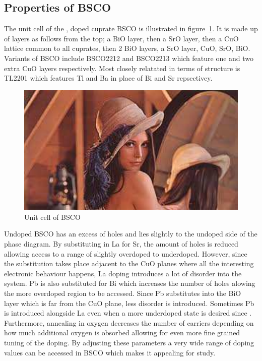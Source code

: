 
\subsection{Properties of \acs{BSCO}}

The unit cell of the \highTc, doped cuprate \acf{BSCO} is illustrated in figure~\ref{Fig:Intro:BSCOUnitCell}. It is made up of layers as follows from the top; a BiO layer, then a SrO layer, then a CuO lattice common to all cuprates, then 2 BiO layers, a SrO layer, CuO, SrO, BiO. Variants of \acs{BSCO} include \ac{BSCO2212} and \ac{BSCO2213} which feature one and two extra CuO layers respectively. Most closely relatated in terms of structure is \acs{TL2201} which features Tl and Ba in place of Bi and Sr repsectivey.
\begin{figure}[htbp]
    \begin{center}
        \includegraphics[scale=0.9]{Misc/TODO}
        \caption{Unit cell of \acs{BSCO}}
        \label{Fig:Intro:BSCOUnitCell}
    \end{center}
\end{figure}
Undoped \ac{BSCO} has an excess of holes and lies slightly to the undoped side of the phase diagram. By substituting in La for Sr, the amount of holes is reduced allowing access to a range of slightly overdoped to underdoped. However, since the substitution takes place adjacent to the CuO planes where all the interesting electronic behaviour happens, La doping introduces a lot of disorder into the system. Pb is also substituted for Bi which increases the number of holes alowing the more overdoped region to be accessed. Since Pb substitutes into the BiO layer which is far from the CuO plane, less disorder is introduced. Sometimes Pb is introduced alongside La even when a more underdoped state is desired since . Furthermore, annealing in oxygen decreases the number of carriers depending on how much additional oxygen is obsorbed allowing for even more fine grained tuning of the doping. By adjusting these parameters a very wide range of doping values can be accessed in \ac{BSCO} which makes it appealing for study.

